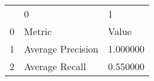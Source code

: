 \begin{tabular}{lll}
 & 0 & 1 \\
0 & Metric & Value \\
1 & Average Precision & 1.000000 \\
2 & Average Recall & 0.550000 \\
\end{tabular}
